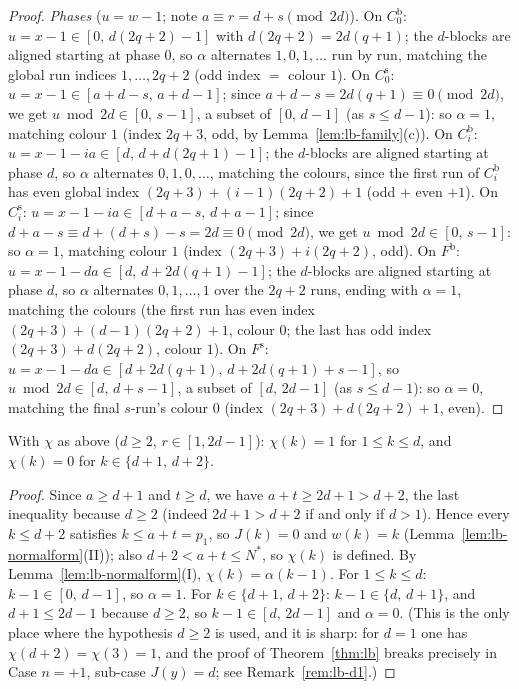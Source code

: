\begin{proof}
\emph{Phases} ($u = w - 1$; note $a \equiv r = d + s \pmod{2d}$). On
$C_0^{\mathrm{b}}$: $u = x - 1 \in [0,\, d(2q+2) - 1]$ with $d(2q+2) = 2d(q+1)$;
the $d$-blocks are aligned starting at phase $0$, so $\alpha$ alternates
$1, 0, 1, \dots$ run by run, matching the global run indices $1, \dots, 2q+2$ (odd
index $=$ colour $1$). On $C_0^{\mathrm{s}}$: $u = x - 1 \in [a+d-s,\, a+d-1]$;
since $a + d - s = 2d(q+1) \equiv 0 \pmod{2d}$, we get
$u \bmod 2d \in [0,\, s-1]$, a subset of $[0,\, d-1]$ (as $s \le d-1$): so
$\alpha = 1$, matching colour $1$ (index $2q+3$, odd, by
Lemma~\ref{lem:lb-family}(c)). On $C_i^{\mathrm{b}}$:
$u = x - 1 - ia \in [d,\, d + d(2q+1) - 1]$; the $d$-blocks are aligned starting
at phase $d$, so $\alpha$ alternates $0, 1, 0, \dots$, matching the colours, since
the first run of $C_i^{\mathrm{b}}$ has even global index
$(2q+3) + (i-1)(2q+2) + 1$ (odd $+$ even $+ 1$). On $C_i^{\mathrm{s}}$:
$u = x - 1 - ia \in [d+a-s,\, d+a-1]$; since
$d + a - s \equiv d + (d+s) - s = 2d \equiv 0 \pmod{2d}$, we get
$u \bmod 2d \in [0,\, s-1]$: so $\alpha = 1$, matching colour $1$ (index
$(2q+3) + i(2q+2)$, odd). On $F^{\mathrm{b}}$:
$u = x - 1 - da \in [d,\, d + 2d(q+1) - 1]$; the $d$-blocks are aligned starting
at phase $d$, so $\alpha$ alternates $0, 1, \dots, 1$ over the $2q+2$ runs, ending
with $\alpha = 1$, matching the colours (the first run has even index
$(2q+3) + (d-1)(2q+2) + 1$, colour $0$; the last has odd index
$(2q+3) + d(2q+2)$, colour $1$). On $F^{\mathrm{s}}$:
$u = x - 1 - da \in [d + 2d(q+1),\, d + 2d(q+1) + s - 1]$, so
$u \bmod 2d \in [d,\, d+s-1]$, a subset of $[d,\, 2d-1]$ (as $s \le d-1$): so
$\alpha = 0$, matching the final $s$-run's colour $0$ (index
$(2q+3) + d(2q+2) + 1$, even).
\end{proof}

\begin{lemma}\label{lem:lb-small}
With $\chi$ as above ($d \ge 2$, $r \in [1, 2d-1]$): $\chi(k) = 1$ for
$1 \le k \le d$, and $\chi(k) = 0$ for $k \in \{d+1,\, d+2\}$.
\end{lemma}

\begin{proof}
Since $a \ge d+1$ and $t \ge d$, we have $a + t \ge 2d + 1 > d + 2$, the last
inequality because $d \ge 2$ (indeed $2d + 1 > d + 2$ if and only if $d > 1$).
Hence every $k \le d+2$ satisfies $k \le a + t = p_1$, so $J(k) = 0$ and
$w(k) = k$ (Lemma~\ref{lem:lb-normalform}(II)); also $d + 2 < a + t \le N^{*}$, so
$\chi(k)$ is defined. By Lemma~\ref{lem:lb-normalform}(I),
$\chi(k) = \alpha(k-1)$. For $1 \le k \le d$: $k - 1 \in [0,\, d-1]$, so
$\alpha = 1$. For $k \in \{d+1,\, d+2\}$: $k - 1 \in \{d,\, d+1\}$, and
$d + 1 \le 2d - 1$ because $d \ge 2$, so $k - 1 \in [d,\, 2d-1]$ and $\alpha = 0$.
(This is the only place where the hypothesis $d \ge 2$ is used, and it is sharp:
for $d = 1$ one has $\chi(d+2) = \chi(3) = 1$, and the proof of
Theorem~\ref{thm:lb} breaks precisely in Case $n = +1$, sub-case $J(y) = d$; see
Remark~\ref{rem:lb-d1}.)
\end{proof}

